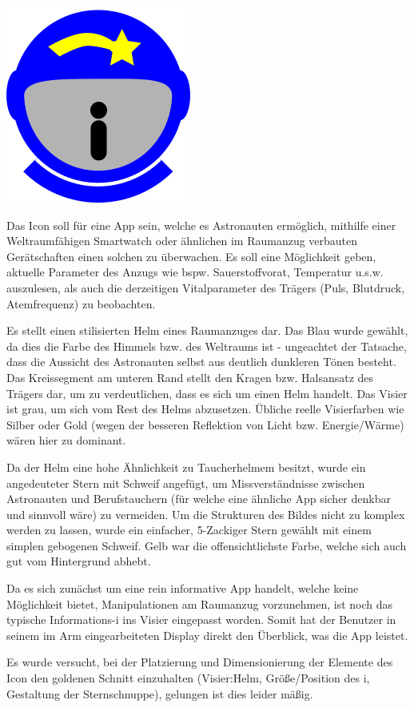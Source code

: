 \documentclass[a4paper,10pt]{article}
\begin{document}
\kopf
\renewcommand{\figurename}{Figure}

\includegraphics[scale=0.6]{Icon.png}

Das Icon soll für eine App sein, welche es Astronauten ermöglich, mithilfe einer Weltraumfähigen Smartwatch oder ähnlichen im Raumanzug verbauten Gerätschaften einen solchen zu überwachen. Es soll eine Möglichkeit geben, aktuelle Parameter des Anzugs wie bspw. Sauerstoffvorat, Temperatur u.s.w. auszulesen, als auch die derzeitigen Vitalparameter des Trägers (Puls, Blutdruck, Atemfrequenz) zu beobachten.

Es stellt einen stilisierten Helm eines Raumanzuges dar. Das Blau wurde gewählt, da dies die Farbe des Himmels bzw. des Weltraums ist - ungeachtet der Tatsache, dass die Aussicht des Astronauten selbst aus deutlich dunkleren Tönen besteht. Das Kreissegment am unteren Rand stellt den Kragen bzw. Halsansatz des Trägers dar, um zu verdeutlichen, dass es sich um einen Helm handelt. Das Visier ist grau, um sich vom Rest des Helms abzusetzen. Übliche reelle Visierfarben wie Silber oder Gold (wegen der besseren Reflektion von Licht bzw. Energie/Wärme) wären hier zu dominant.

Da der Helm eine hohe Ähnlichkeit zu Taucherhelmem besitzt, wurde ein angedeuteter Stern mit Schweif angefügt, um Missverständnisse zwischen Astronauten und Berufstauchern (für welche eine ähnliche App sicher denkbar und sinnvoll wäre) zu vermeiden. Um die Strukturen des Bildes nicht zu komplex werden zu lassen, wurde ein einfacher, 5-Zackiger Stern gewählt mit einem simplen gebogenen Schweif. Gelb war die offensichtlichste Farbe, welche sich auch gut vom Hintergrund abhebt.

Da es sich zunächst um eine rein informative App handelt, welche keine Möglichkeit bietet, Manipulationen am Raumanzug vorzunehmen, ist noch das typische Informations-i ins Visier eingepasst worden. Somit hat der Benutzer in seinem im Arm eingearbeiteten Display direkt den Überblick, was die App leistet.

Es wurde versucht, bei der Platzierung und Dimensionierung der Elemente des Icon den goldenen Schnitt einzuhalten (Visier:Helm, Größe/Position des i, Gestaltung der Sternschnuppe), gelungen ist dies leider mäßig.
\end{document}
